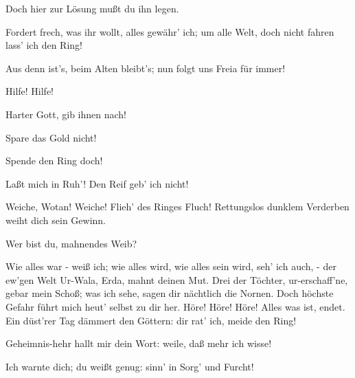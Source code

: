 \begin{drama}
\Fafnerspeaks
Doch hier zur Lösung mußt du ihn legen.
 

\Wotanspeaks
Fordert frech, was ihr wollt,
alles gewähr' ich;
um alle Welt,
doch nicht fahren lass' ich den Ring!
 

\Fasoltspeaks


Aus denn ist's, beim Alten bleibt's;
nun folgt uns Freia für immer!
 

\Freiaspeaks
Hilfe! Hilfe!
 

\Frickaspeaks
Harter Gott, gib ihnen nach!
 

\Frohspeaks
Spare das Gold nicht!
 

\Donnerspeaks
Spende den Ring doch!
 




\Wotanspeaks
Laßt mich in Ruh'! Den Reif geb' ich nicht!
 




\Erdaspeaks


Weiche, Wotan! Weiche!
Flieh' des Ringes Fluch!
Rettungslos dunklem Verderben
weiht dich sein Gewinn.
 

\Wotanspeaks
Wer bist du, mahnendes Weib?
 

\Erdaspeaks
Wie alles war - weiß ich;
wie alles wird, wie alles sein wird,
seh' ich auch, -
der ew'gen Welt Ur-Wala,
Erda, mahnt deinen Mut. Drei der Töchter,
ur-erschaff'ne, gebar mein Schoß;
was ich sehe, sagen dir nächtlich die Nornen.
Doch höchste Gefahr führt mich heut'
selbst zu dir her.
Höre! Höre! Höre!
Alles was ist, endet.
Ein düst'rer Tag dämmert den Göttern:
dir rat' ich, meide den Ring!
 




\Wotanspeaks
Geheimnis-hehr
hallt mir dein Wort:
weile, daß mehr ich wisse!
 

\Erdaspeaks
{}
Ich warnte dich; du weißt genug:
sinn' in Sorg' und Furcht!
 



\end{drama}
